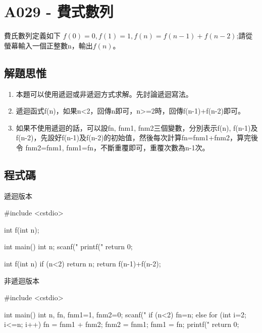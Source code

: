 \section{A029 - 費式數列}
費氏數列定義如下 $f(0)=0, f(1)=1, f(n)=f(n-1)+f(n-2)$;請從螢幕輸入一個正整數n，輸出$f(n)$。

\subsection{解題思惟}

\begin{enumerate}
\item 本題可以使用遞迴或非遞迴方式求解。先討論遞迴寫法。
\item 遞迴函式f(n)，如果n<2，回傳n即可，n>=2時，回傳f(n-1)+f(n-2)即可。
\item 如果不使用遞迴的話，可以設fn, fnm1, fnm2三個變數，分別表示f(n), f(n-1)及f(n-2)，先設好f(n-1)及f(n-2)的初始值，然後每次計算fn=fnm1+fnm2，算完後令 fnm2=fnm1, fnm1=fn，不斷重覆即可，重覆次數為n-1次。
\end{enumerate}

\subsection{程式碼}
遞迴版本
\begin{cppcode}
#include <cstdio>

int f(int n);

int main()
{
	int n;
	scanf("%
	printf("%
	return 0;
}

int f(int n)
{
	if (n<2) return n;
	return f(n-1)+f(n-2);
}
\end{cppcode}
非遞迴版本
\begin{cppcode}
#include <cstdio>

int main()
{
	int n, fn, fnm1=1, fnm2=0;
	scanf("%
	if (n<2) fn=n;
	else for (int i=2; i<=n; i++) {
		fn = fnm1 + fnm2;
		fnm2 = fnm1;
		fnm1 = fn;
	}
	printf("%
	return 0;
}
\end{cppcode}
